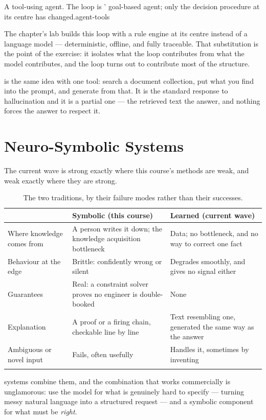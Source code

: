 {A tool-using agent. The loop is ' goal-based agent; only the
decision procedure at its centre has changed.}{agent-tools}

The chapter's lab builds this loop with a rule engine at its centre instead of a
language model --- deterministic, offline, and fully traceable. That substitution is
the point of the exercise: it isolates what the loop contributes from what the model
contributes, and the loop turns out to contribute most of the structure.

 is the same idea with one tool: search a
document collection, put what you find into the prompt, and generate from that. It
is the standard response to hallucination and it is a partial one --- the retrieved
text  the answer, and nothing forces the answer to respect it.

\section{Neuro-Symbolic Systems}

The current wave is strong exactly where this course's methods are weak, and weak
exactly where they are strong.

\smallskip
\noindent\begin{longtable}{@{}L{3.9cm}L{5.4cm}L{5.4cm}@{}}
\toprule
{}
 & \textbf{Symbolic (this course)} & \textbf{Learned (current wave)} \\
\midrule
\endhead
Where knowledge comes from & A person writes it down; the knowledge acquisition
bottleneck & Data; no bottleneck, and no way to correct one fact \\
Behaviour at the edge & Brittle: confidently wrong or silent & Degrades smoothly,
and gives no signal either \\
Guarantees & Real: a constraint solver proves no engineer is double-booked &
None \\
Explanation & A proof or a firing chain, checkable line by line & Text resembling
one, generated the same way as the answer \\
Ambiguous or novel input & Fails, often usefully & Handles it, sometimes by
inventing \\
\bottomrule
\caption{The two traditions, by their failure modes rather than their
successes.}\label{tab:neurosymbolic}
\end{longtable}

 systems combine them, and the combination that works
commercially is unglamorous: use the model for what is genuinely hard to specify ---
turning messy natural language into a structured request --- and a symbolic
component for what must be \emph{right}.

